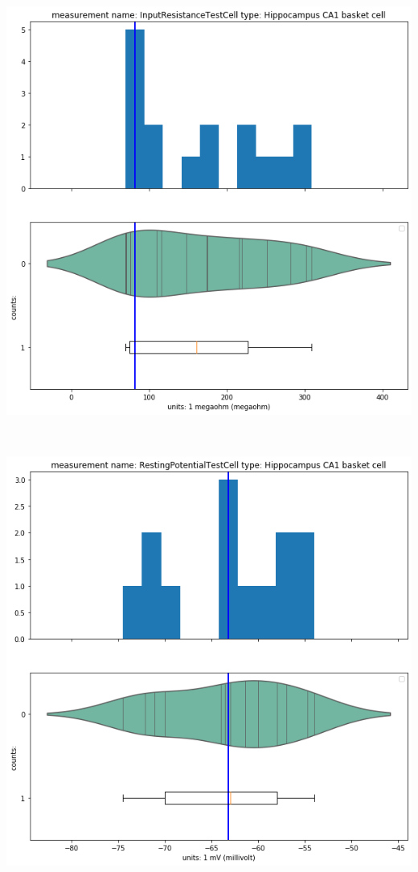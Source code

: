     \begin{center}
   \includegraphics[width=0.7\linewidth]{notebooks_converted/needata_thesis_files/needata_thesis_5_5}
    \end{center}
    { \hspace*{\fill} \\}
    
    \begin{center}
    \includegraphics[width=0.7\linewidth]{notebooks_converted/needata_thesis_files/needata_thesis_5_6}
    \end{center}
    { \hspace*{\fill} \\}
    
